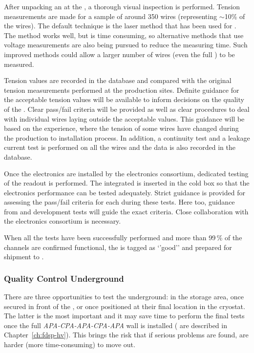After unpacking an  at the , a thorough visual inspection is performed. Tension measurements are made for a sample of around \num{350} wires (representing $\sim$10\% of the wires). The default technique is the laser method that has been used for .  The method works well, but is time consuming, so alternative methods that use voltage measurements are also being pursued to reduce the measuring time. Such improved methods could allow a larger number of wires (even the full ) to be measured. 

Tension values are recorded in the database and compared with the original tension measurements performed at the production sites. Definite guidance for the acceptable tension values will be available to inform decisions on the quality of the . Clear pass/fail criteria %
will be provided as well as clear procedures to deal with individual wires laying outside the acceptable values. %
This guidance will be based on the  experience, where the tension of some wires have changed during the production to installation process. In addition, a continuity test and a leakage current test is performed on all the wires and the data is also recorded in the database. 

Once the electronics are installed by the electronics consortium, dedicated testing of the  readout is performed. The integrated  is inserted in the cold box so that the electronics performance can be tested adequately. Strict guidance is provided %
for assessing the pass/fail criteria for each  during these tests. Here too, guidance from  and development tests will guide the exact criteria. Close collaboration with the electronics consortium is necessary.

When all the tests have been successfully performed and more than \num{99}\,\% of the channels are confirmed functional, the  is  tagged as `'good'' and prepared for shipment to \surf{}.

\subsubsection{Quality Control Underground}
\label{sec:fdsp-apa-install-qc_underground}

There are three opportunities to test the  underground: in the storage area, once secured in front of the , or once positioned at their final location in the cryostat. The latter is the most important and it may save time to perform the final tests once the full \textit{APA-CPA-APA-CPA-APA} wall is installed ( are described in Chapter~\ref{ch:fdsp-hv}). This brings the risk that if serious problems are found,  are harder (more time-consuming) to move out.

